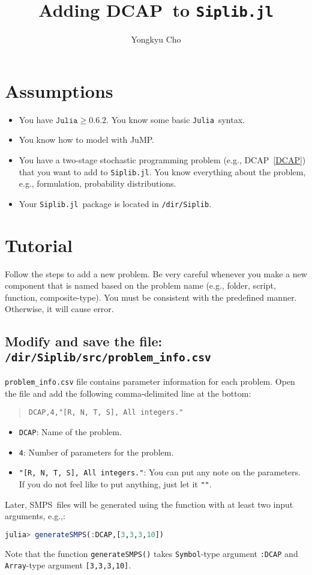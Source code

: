 \documentclass[11pt]{article}
\newcommand{\smps}{\textsf{SMPS}}
\newcommand{\jump}{\textsf{JuMP}}
\newcommand{\dcap}{\textsf{DCAP}}
\newcommand{\julia}{\texttt{Julia}}
\newcommand{\siplibjl}{\texttt{Siplib.jl}}
\begin{document}
\nocite{*}
\title{Adding \dcap\ to \siplibjl}
\author{Yongkyu Cho}
\maketitle
\section{Assumptions}
\begin{itemize}
	\item You have $\julia\ge 0.6.2$. You know some basic \julia\ syntax.
	\item You know how to model with \jump.
	\item You have a two-stage stochastic programming problem (e.g., \dcap\ \ref{DCAP}) that you want to add to \siplibjl. You know everything about the problem, e.g., formulation, probability distributions.
	\item Your \siplibjl\ package is located in \texttt{/dir/Siplib}.
\end{itemize}

\section{Tutorial}
Follow the steps to add a new problem. Be very careful whenever you make a new component that is named based on the problem name (e.g., folder, script, function, composite-type). You must be consistent with the predefined manner. Otherwise, it will cause error. 
\subsection{Modify and save the file: \texttt{/dir/Siplib/src/problem\_info.csv}}
\texttt{problem\_info.csv} file contains parameter information for each problem. Open the file and add the following comma-delimited line at the bottom:
\begin{quote}\noindent\centering \texttt{DCAP,4,"[R, N, T, S], All integers."}\end{quote}
\begin{itemize}
	\item \texttt{DCAP}: Name of the problem.
	\item \texttt{4}: Number of parameters for the problem.
	\item \texttt{"[R, N, T, S], All integers."}: You can put any note on the parameters. If you do not feel like to put anything, just let it \texttt{""}.
\end{itemize}
Later, \smps\ files will be generated using the function with at least two input arguments, e.g.,: 
\begin{lstlisting}[frame=single,language=julia]
julia> generateSMPS(:DCAP,[3,3,3,10])
\end{lstlisting}
Note that the function \texttt{generateSMPS()} takes \texttt{Symbol}-type argument \texttt{:DCAP} and \texttt{Array}-type argument \texttt{[3,3,3,10]}.
\end{document}
